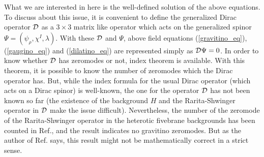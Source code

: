 \documentclass[a4paper,aps, amssymb, preprint, 12pt]{revtex4}
\begin{document}
What we are interested in here is the well-defined solution of the above equations.
To discuss about this issue, it is convenient to define the generalized Dirac operator ${\cal D}$ as a $3\times 3$ matrix like operator which acts on the generalized spinor $\Psi=(\psi_\rho,\chi^I,\lambda)$.
With these $\cal D$ and $\Psi$, above field equations (\ref{gravitino_eq}), (\ref{gaugino_eq}) and (\ref{dilatino_eq}) are represented simply as ${\cal D}\Psi=0$.
In order to know whether $\cal D$ has zeromodes or not, index theorem is available.
With this theorem, it is possible to know the number of zeromodes which the Dirac operator has.
But, while the index formula for the usual Dirac operator (which acts on a Dirac spinor) is well-known\cite{APS}, the one for the operator ${\cal D}$ has not been known so far (the existence of the background $H$ and the Rarita-Shwinger operator in ${\cal D}$ make the issue difficult).
Nevertheless, the number of the zeromode of the Rarita-Shwinger operator in the heterotic fivebrane  backgrounds has been counted in Ref.\cite{Bellisai}, and the result indicates no gravitino zeromodes.
But as the author of Ref.\cite{Bellisai} says, this result might not be mathematically correct in a strict sense.
\end{document}
